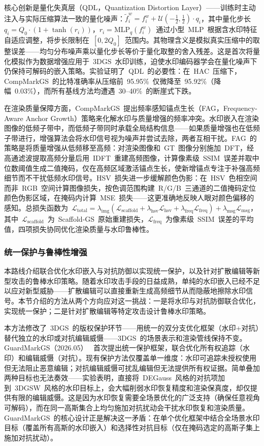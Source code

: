 核心创新是量化失真层（QDL，Quantization Distortion Layer）——训练时主动注入与实际压缩算法一致的量化噪声：$\tilde{f}^w_i = f^w_i + \mathcal{U}(-\frac{1}{2}, \frac{1}{2}) \cdot q_i$，其中量化步长~$q_i = Q_0 \cdot (1 + \tanh(r_i))$，$r_i = \mathrm{MLP}_q(f^w_i)$~通过小型~MLP~根据含水印特征自适应调整，将步长限制在~$[0, 2Q_0]$~范围内。其物理含义是模拟真实压缩中的取整误差——均匀分布噪声乘以量化步长等价于量化取整的舍入残差。这是首次将量化模拟作为数据增强应用于~3DGS~水印训练，迫使水印编码器学会在量化噪声下仍保持可解码的嵌入策略。实验证明了~QDL~的必要性：在~HAC~压缩下，CompMarkGS~的比特准确率从压缩前~95.95\%~仅微降至~95.92\%（降幅~0.03\%），而所有基线方法均遭遇~30--40\%~的断崖式下跌。

在渲染质量保障方面，CompMarkGS~提出频率感知锚点生长（FAG，Frequency-Aware Anchor Growth）策略来化解水印与质量增强的频率冲突。水印嵌入在渲染图像的低频子带中，而低频子带同时承载全局结构信息——如果质量增强也在低频子带进行，增强算法会将水印信号视为噪声并尝试去除，两者互相干扰。FAG~的策略是将质量增强从低频移至高频：对渲染图像和~GT~图像分别施加~DFT，经高通滤波提取高频分量后用~IDFT~重建高频图像，计算像素级~SSIM~误差并取中位数阈值生成二值掩码，仅在高频区域激活锚点生长，使新增锚点专注于补强高频细节而不干扰低频水印信号。HSV~损失进一步缓解颜色伪影：在~HSV~色相空间而非~RGB~空间计算图像损失，按色调范围构建~R/G/B~三通道的二值掩码定位颜色伪影区域，在掩码内计算~MSE~损失——这更准确地反映人眼对颜色偏移的感知。总损失函数为~$\mathcal{L}_{\mathrm{total}} = \lambda_{\mathrm{img}}(\mathcal{L}_{\mathrm{scaffold}} + \lambda_{\mathrm{hsv}}\mathcal{L}_{\mathrm{hsv}} + \lambda_{\mathrm{freq}}\mathcal{L}_{\mathrm{freq}}) + \lambda_{\mathrm{msg}}\mathcal{L}_{\mathrm{msg}}$，其中~$\mathcal{L}_{\mathrm{scaffold}}$~为~Scaffold-GS~原始重建损失，$\mathcal{L}_{\mathrm{freq}}$~为像素级~SSIM~误差的平均值，四项损失协同优化渲染质量与水印鲁棒性。

\subsubsection{统一保护与鲁棒性增强}

本路线介绍联合优化水印嵌入与对抗防御以实现统一保护，以及针对扩散编辑等新型攻击的鲁棒水印策略。随着水印攻击手段的日益成熟，单纯的水印嵌入已经不足以应对新型威胁——扩散编辑可以直接重新生成高频细节从而隐蔽地擦除水印信号。本节介绍的方法从两个方向应对这一挑战：一是将水印与对抗防御联合优化，实现统一保护；二是针对扩散编辑等特定攻击设计鲁棒水印策略。

本方法修改了~3DGS~的版权保护环节——用统一的双分支优化框架（水印+对抗）替代独立的水印或对抗编辑威慑——3DGS~的场景表示和渲染管线保持不变。GuardMarkGS（2026.05）~\cite{2605_12919} 首次提出统一保护框架，联合优化所有权追踪（水印）和编辑威慑（对抗）。现有保护方法仅覆盖单一维度：水印可追踪未授权使用但无法阻止恶意编辑；对抗编辑威慑可扰乱编辑但无法提供所有权证据。简单叠加两种目标也无法奏效——实验表明，直接将~DEGauss~风格的对抗项加到~3DGSW~风格的水印目标上，会大幅削弱水印恢复精度和渲染保真度，却仅提供有限的编辑威慑。这是因为水印恢复需要全场景优化的广泛支持（确保任意视角可解码），而在同一高斯集合上均匀施加对抗扰动会干扰水印恢复和渲染质量。GuardMarkGS~的核心设计正是解决这一矛盾：在单个优化框架中结合全场景水印目标（覆盖所有高斯的水印嵌入）和选择性对抗目标（仅在掩码选定的高斯子集上施加对抗扰动）。

